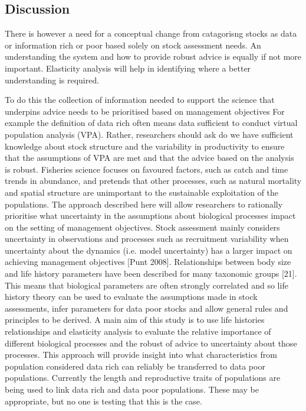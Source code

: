\documentclass{pnastwo}
\begin{document}
\begin{article}
\section{Discussion}

There is however a need for a conceptual change from catagorisng stocks as  data or information rich or poor based solely on stock assessment needs. An understanding the system and how to provide robust advice is equally if not more important. Elasticity analysis will  help in identifying where a better understanding is required.

To do this the collection of information needed to support the science that underpins advice needs to be prioritised based on management objectives For example the deﬁnition of data rich often means data suﬃcient to conduct virtual population analysis (VPA). Rather, researchers should ask do we have suﬃcient knowledge about stock structure and the variability in productivity to ensure that the assumptions of VPA are met and that the advice based on the analysis is robust. Fisheries science focuses on favoured factors, such as catch and time trends in abundance, and pretends that other processes, such as natural mortality and spatial structure are unimportant to the sustainable exploitation of the populations. The approach described here will allow researchers to rationally prioritise what uncertainty in the assumptions about biological processes impact on the setting of management objectives.
Stock assessment mainly considers uncertainty in observations and processes such as recruitment variability when uncertainty about the dynamics (i.e. model uncertainty) has a larger impact on achieving management objectives [Punt 2008]. Relationships between body size and life history parameters have been described for many taxonomic groups [21]. This means that biological parameters are often strongly correlated and so life history theory can be used to evaluate the assumptions made in stock assessments, infer parameters for data poor stocks and allow general rules and principles to be derived. A main aim of this study is to use life histories relationships and elasticity analysis to evaluate the relative importance of diﬀerent biological processes and the robust of advice to uncertainty about those processes. This approach will provide insight into what characteristics from population considered data rich can reliably be transferred to data poor populations. Currently the length and reproductive traits of populations are being used to link data rich and data poor populations. These may be appropriate, but no one is testing that this is the case.



\end{article}
\end{document}
